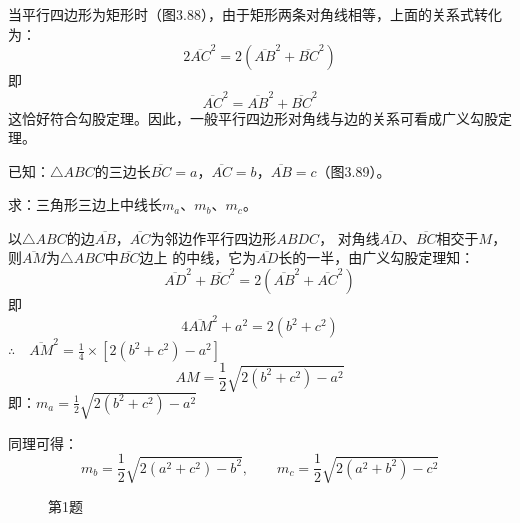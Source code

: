 当平行四边形为矩形时（图3.88），由于矩形两条对角线相等，上面的关系式转化为：
\[2\overline{AC}^2=2\left(\overline{AB}^2+\overline{BC}^2\right)\]
即
\[\overline{AC}^2=\overline{AB}^2+\overline{BC}^2\]
这恰好符合勾股定理。因此，一般平行四边形对角线与边的关系可看成广义勾股定理。
    
\begin{example}
    已知：$\triangle ABC$的三边长$\overline{BC}=a$，$\overline{AC}=b$，$\overline{AB}=c$（图3.89）。

求：三角形三边上中线长$m_a$、$m_b$、$m_c$。
\end{example}


\begin{solution}
    以$\triangle ABC$的边$\overline{AB}$，$\overline{AC}$为邻边作平行四边形$ABDC$，
对角线$\overline{AD}$、$\overline{BC}$相交于$M$，则$\overline{AM}$为$\triangle ABC$中$\overline{BC}$边上
的中线，它为$\overline{AD}$长的一半，由广义勾股定理知：
\[\overline{AD}^2+\overline{BC}^2=2\left(\overline{AB}^2+\overline{AC}^2\right)\]
即
\[4\overline{AM}^2+a^2=2(b^2+c^2)\]
$\therefore\quad \overline{AM}^2=\frac{1}{4}\times [2(b^2+c^2)-a^2]$
\[AM=\frac{1}{2}\sqrt{2(b^2+c^2)-a^2}\]
即：$m_a=\frac{1}{2}\sqrt{2(b^2+c^2)-a^2}$

同理可得：
\[m_b=\frac{1}{2}\sqrt{2(a^2+c^2)-b^2},\qquad m_c=\frac{1}{2}\sqrt{2(a^2+b^2)-c^2}\]
\end{solution}

\begin{figure}
    \begin{minipage}[t]{0.48\linewidth}
    \centering
\begin{tikzpicture}[>=latex, scale=1]
    \end{tikzpicture}
    \caption{}
    \end{minipage}
    \begin{minipage}[t]{0.48\linewidth}
    \centering
    \begin{tikzpicture}[>=latex, scale=1]
    \end{tikzpicture}
    \caption*{第1题}
    \end{minipage}
    \end{figure}



